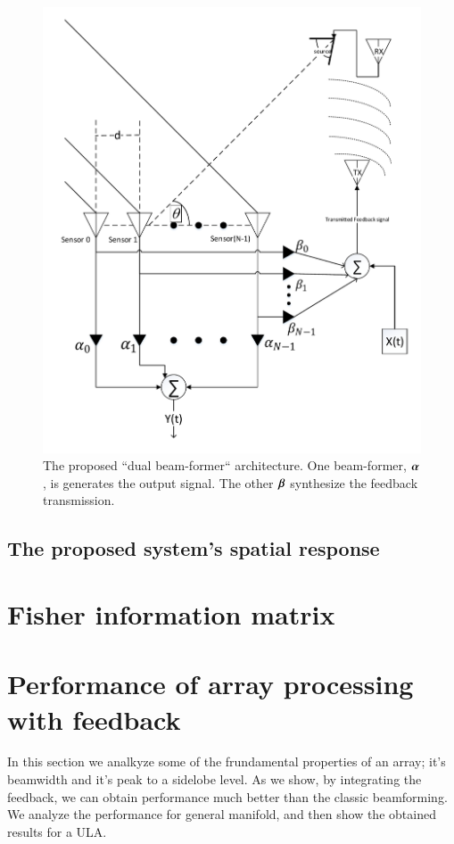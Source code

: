 \begin{figure}[!h]
\begin{center}
\includegraphics[width=0.75\linewidth]{./Media/SpatialIIR-diagram/SpatialIIR_VER5.pdf}
\caption{The proposed ``dual beam-former`` architecture. One beam-former, $\boldsymbol{\alpha}$, is generates the output signal. The other $\boldsymbol{\beta}$ synthesize the feedback transmission.}
\label{fig:Proposed_spatialIIR_ARCH}
\end{center}
\end{figure}
\subsection*{The proposed system's spatial response}

\section{Fisher information matrix}

\section{Performance of array processing with feedback}
In this section we analkyze some of the frundamental properties of an array; it's beamwidth and it's peak to a sidelobe level. As we show, by integrating the feedback, we can obtain performance much better than the classic  beamforming. We analyze the performance for general manifold, and then show the obtained results for a ULA. 
